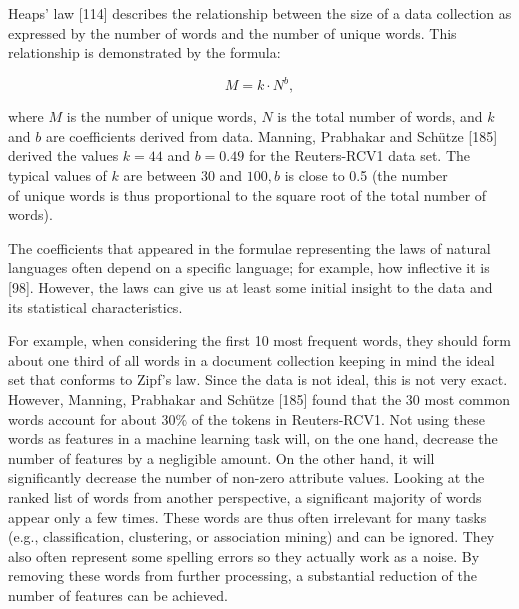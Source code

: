 \documentclass[11pt,openany,executivepaper]{book}
\begin{document}
Heaps' law [114] describes the relationship between the size of a data collection as expressed by the number of words and the number of unique words. This relationship is demonstrated by the formula:


\begin{equation*}
M=k \cdot N^{b}, \tag{3.3}
\end{equation*}


where $M$ is the number of unique words, $N$ is the total number of words, and $k$ and $b$ are coefficients derived from data. Manning, Prabhakar and Schütze [185] derived the values $k=44$ and $b=0.49$ for the Reuters-RCV1 data set. The typical values of $k$ are between 30 and $100, b$ is close to 0.5 (the number\\
of unique words is thus proportional to the square root of the total number of words).

The coefficients that appeared in the formulae representing the laws of natural languages often depend on a specific language; for example, how inflective it is [98]. However, the laws can give us at least some initial insight to the data and its statistical characteristics.

For example, when considering the first 10 most frequent words, they should form about one third of all words in a document collection keeping in mind the ideal set that conforms to Zipf's law. Since the data is not ideal, this is not very exact. However, Manning, Prabhakar and Schütze [185] found that the 30 most common words account for about $30 \%$ of the tokens in Reuters-RCV1. Not using these words as features in a machine learning task will, on the one hand, decrease the number of features by a negligible amount. On the other hand, it will significantly decrease the number of non-zero attribute values. Looking at the ranked list of words from another perspective, a significant majority of words appear only a few times. These words are thus often irrelevant for many tasks (e.g., classification, clustering, or association mining) and can be ignored. They also often represent some spelling errors so they actually work as a noise. By removing these words from further processing, a substantial reduction of the number of features can be achieved.
\end{document}
